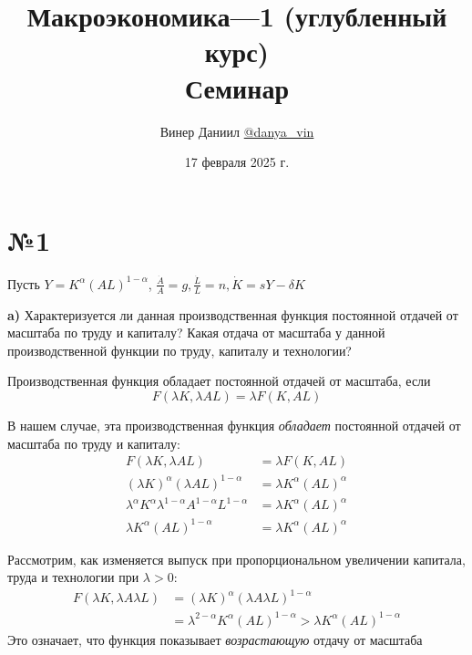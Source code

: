 \documentclass[a4paper, 10pt]{article}
\title{\LARGE{Макроэкономика—1 (углубленный курс)}\\[2mm]
\large{Семинар}}
\author{Винер Даниил  \href{https://t.me/danya_vin}{@danya\_vin}}
\date{17 февраля 2025 г.}
\begin{document}
\maketitle
\setlength{\parindent}{15pt}
\setlength{\parskip}{2mm}

\section*{№1}
Пусть $Y=K^{\alpha}(AL)^{1-\alpha}$, $\displaystyle\frac{\dot{A}}{A}=g, \frac{\dot{L}}{L}=n, \dot{K}=sY-\delta K$

\begin{tcolorbox}[colback=blue!20!white, colframe=black!100!black]
    \textbf{a)} Характеризуется ли данная производственная функция постоянной отдачей от масштаба по труду и капиталу? Какая отдача от масштаба у данной производственной функции по труду, капиталу и технологии?
\end{tcolorbox}
Производственная функция обладает постоянной отдачей от масштаба, если 
\begin{equation*}
    F(\lambda K,\lambda AL)=\lambda F(K, AL)
\end{equation*}

В нашем случае, эта производственная функция \textit{обладает} постоянной отдачей от масштаба по труду и капиталу:
\begin{equation*}
    \begin{aligned}
        F(\lambda K,\lambda AL)&=\lambda F(K, AL)\\
        (\lambda K)^{\alpha}(\lambda AL)^{1-\alpha}&=\lambda K^{\alpha}(AL)^{\alpha}\\
        \lambda^{\alpha}K^{\alpha}\lambda^{1-\alpha}A^{1-\alpha}L^{1-\alpha}&=\lambda K^{\alpha}(AL)^{\alpha}\\
        \lambda K^{\alpha}(AL)^{1-\alpha}&=\lambda K^{\alpha}(AL)^{\alpha}
    \end{aligned}
\end{equation*}

Рассмотрим, как изменяется выпуск при пропорциональном увеличении капитала, труда и технологии при $\lambda>0$:
\begin{equation*}
    \begin{aligned}
        F(\lambda K, \lambda A\lambda L)&= (\lambda K)^\alpha (\lambda A \lambda L)^{1-\alpha}\\
        &=\lambda^{2-\alpha}K^{\alpha}(AL)^{1-\alpha}>\lambda K^{\alpha}(AL)^{1-\alpha}
    \end{aligned}
\end{equation*}
Это означает, что функция показывает \textit{возрастающую} отдачу от масштаба
\end{document}
